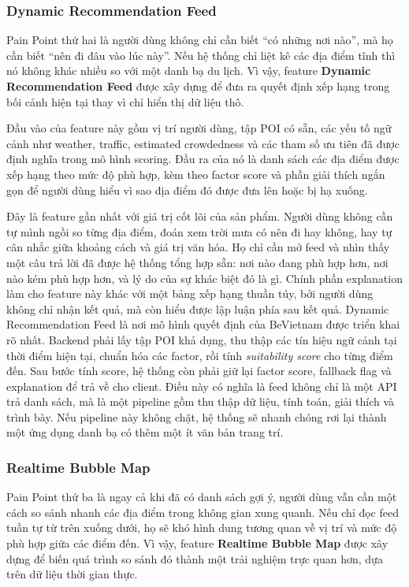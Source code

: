 \subsubsection{Dynamic Recommendation Feed}
\contrib

Pain Point thứ hai là người dùng không chỉ cần biết ``có những nơi nào'',
mà họ cần biết ``nên đi đâu vào lúc này''. Nếu hệ thống chỉ liệt kê các
địa điểm tĩnh thì nó không khác nhiều so với một danh bạ du lịch. Vì
vậy, feature \textbf{Dynamic Recommendation Feed} được xây dựng để đưa ra
quyết định xếp hạng trong bối cảnh hiện tại thay vì chỉ hiển thị dữ liệu
thô.

Đầu vào của feature này gồm vị trí người dùng, tập POI có sẵn, các yếu
tố ngữ cảnh như weather, traffic, estimated crowdedness và các tham số
ưu tiên đã được định nghĩa trong mô hình scoring. Đầu ra của nó là danh
sách các địa điểm được xếp hạng theo mức độ phù hợp, kèm theo factor
score và phần giải thích ngắn gọn để người dùng hiểu vì sao địa điểm đó
được đưa lên hoặc bị hạ xuống.

Đây là feature gần nhất với giá trị cốt lõi của sản
phẩm. Người dùng không cần tự mình ngồi so từng địa điểm, đoán xem trời
mưa có nên đi hay không, hay tự cân nhắc giữa khoảng cách và giá trị văn
hóa. Họ chỉ cần mở feed và nhìn thấy một câu trả lời đã được hệ thống
tổng hợp sẵn: nơi nào đang phù hợp hơn, nơi nào kém phù hợp hơn, và lý
do của sự khác biệt đó là gì. Chính phần explanation làm cho feature này
khác với một bảng xếp hạng thuần túy, bởi người dùng không chỉ nhận kết
quả, mà còn hiểu được lập luận phía sau kết quả. Dynamic Recommendation Feed là nơi mô hình quyết
định của BeVietnam được triển khai rõ nhất. Backend phải lấy tập POI
khả dụng, thu thập các tín hiệu ngữ cảnh tại thời điểm hiện tại, chuẩn
hóa các factor, rồi tính \textit{suitability score} cho từng điểm đến.
Sau bước tính score, hệ thống còn phải giữ lại factor score, fallback
flag và explanation để trả về cho client. Điều này có nghĩa là feed
không chỉ là một API trả danh sách, mà là một pipeline gồm thu thập dữ
liệu, tính toán, giải thích và trình bày. Nếu pipeline này không chặt,
hệ thống sẽ nhanh chóng rơi lại thành một ứng dụng danh bạ có thêm một
ít văn bản trang trí.

\subsubsection{Realtime Bubble Map}
\contrib

Pain Point thứ ba là ngay cả khi đã có danh sách gợi ý, người dùng vẫn
cần một cách so sánh nhanh các địa điểm trong không gian xung quanh. Nếu
chỉ đọc feed tuần tự từ trên xuống dưới, họ sẽ khó hình dung tương quan
về vị trí và mức độ phù hợp giữa các điểm đến. Vì vậy, feature
\textbf{Realtime Bubble Map} được xây dựng để biến quá trình so sánh
đó thành một trải nghiệm trực quan hơn, dựa trên dữ liệu thời gian thực.

